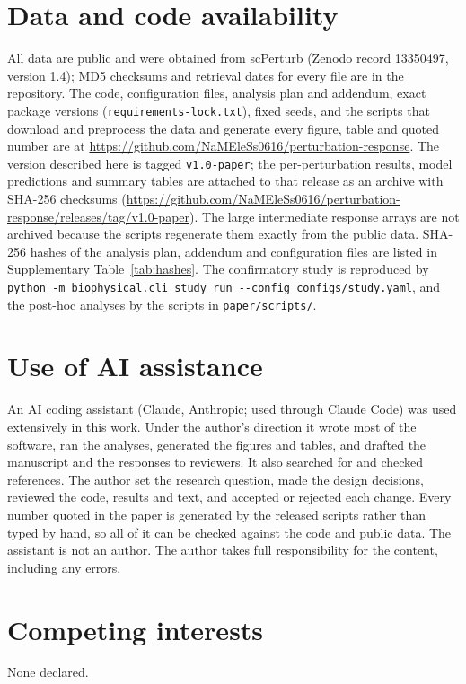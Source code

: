 \section*{Data and code availability}
All data are public and were obtained from scPerturb \citep{peidli2024} (Zenodo record 13350497, version 1.4); MD5 checksums and retrieval dates for every file are in the repository. The code, configuration files, analysis plan and addendum, exact package versions (\texttt{requirements-lock.txt}), fixed seeds, and the scripts that download and preprocess the data and generate every figure, table and quoted number are at \url{https://github.com/NaMEleSs0616/perturbation-response}. The version described here is tagged \texttt{v1.0-paper}; the per-perturbation results, model predictions and summary tables are attached to that release as an archive with SHA-256 checksums (\url{https://github.com/NaMEleSs0616/perturbation-response/releases/tag/v1.0-paper}). The large intermediate response arrays are not archived because the scripts regenerate them exactly from the public data. SHA-256 hashes of the analysis plan, addendum and configuration files are listed in Supplementary Table~\ref{tab:hashes}. The confirmatory study is reproduced by \texttt{python -m biophysical.cli study run -{}-config configs/study.yaml}, and the post-hoc analyses by the scripts in \texttt{paper/scripts/}.

\section*{Use of AI assistance}
An AI coding assistant (Claude, Anthropic; used through Claude Code) was used extensively in this work. Under the author's direction it wrote most of the software, ran the analyses, generated the figures and tables, and drafted the manuscript and the responses to reviewers. It also searched for and checked references. The author set the research question, made the design decisions, reviewed the code, results and text, and accepted or rejected each change. Every number quoted in the paper is generated by the released scripts rather than typed by hand, so all of it can be checked against the code and public data. The assistant is not an author. The author takes full responsibility for the content, including any errors.

\section*{Competing interests}
None declared.
